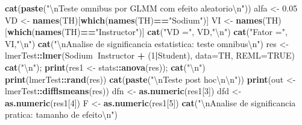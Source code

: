 \documentclass[]{article}
\newenvironment{Shaded}{\begin{snugshade}}{\end{snugshade}}
\newcommand{\KeywordTok}[1]{\textcolor[rgb]{0.13,0.29,0.53}{\textbf{#1}}}
\newcommand{\DataTypeTok}[1]{\textcolor[rgb]{0.13,0.29,0.53}{#1}}
\newcommand{\DecValTok}[1]{\textcolor[rgb]{0.00,0.00,0.81}{#1}}
\newcommand{\FloatTok}[1]{\textcolor[rgb]{0.00,0.00,0.81}{#1}}
\newcommand{\CharTok}[1]{\textcolor[rgb]{0.31,0.60,0.02}{#1}}
\newcommand{\StringTok}[1]{\textcolor[rgb]{0.31,0.60,0.02}{#1}}
\newcommand{\OtherTok}[1]{\textcolor[rgb]{0.56,0.35,0.01}{#1}}
\newcommand{\OperatorTok}[1]{\textcolor[rgb]{0.81,0.36,0.00}{\textbf{#1}}}
\newcommand{\NormalTok}[1]{#1}
\begin{document}
\begin{Shaded}
\begin{Highlighting}[]
\KeywordTok{cat}\NormalTok{(}\KeywordTok{paste}\NormalTok{(}\StringTok{"}\CharTok{\textbackslash{}n}\StringTok{Teste omnibus por GLMM com efeito aleatorio}\CharTok{\textbackslash{}n}\StringTok{"}\NormalTok{))}
\NormalTok{alfa <-}\StringTok{ }\FloatTok{0.05}
\NormalTok{VD <-}\StringTok{ }\KeywordTok{names}\NormalTok{(TH)[}\KeywordTok{which}\NormalTok{(}\KeywordTok{names}\NormalTok{(TH)}\OperatorTok{==}\StringTok{"Sodium"}\NormalTok{)]}
\NormalTok{VI <-}\StringTok{ }\KeywordTok{names}\NormalTok{(TH)[}\KeywordTok{which}\NormalTok{(}\KeywordTok{names}\NormalTok{(TH)}\OperatorTok{==}\StringTok{"Instructor"}\NormalTok{)]}
\KeywordTok{cat}\NormalTok{(}\StringTok{"VD ="}\NormalTok{, VD,}\StringTok{"}\CharTok{\textbackslash{}n}\StringTok{"}\NormalTok{)}
\KeywordTok{cat}\NormalTok{(}\StringTok{"Fator ="}\NormalTok{, VI,}\StringTok{"}\CharTok{\textbackslash{}n}\StringTok{"}\NormalTok{)}
\KeywordTok{cat}\NormalTok{(}\StringTok{"}\CharTok{\textbackslash{}n}\StringTok{Analise de significancia estatistica: teste omnibus}\CharTok{\textbackslash{}n}\StringTok{"}\NormalTok{)}
\NormalTok{res <-}\StringTok{ }\NormalTok{lmerTest}\OperatorTok{::}\KeywordTok{lmer}\NormalTok{(Sodium}\OperatorTok{~}\NormalTok{Instructor }\OperatorTok{+}\StringTok{ }\NormalTok{(}\DecValTok{1}\OperatorTok{|}\NormalTok{Student), }\DataTypeTok{data=}\NormalTok{TH, }\DataTypeTok{REML=}\OtherTok{TRUE}\NormalTok{)}
\KeywordTok{cat}\NormalTok{(}\StringTok{"}\CharTok{\textbackslash{}n}\StringTok{"}\NormalTok{); }\KeywordTok{print}\NormalTok{(res1 <-}\StringTok{ }\NormalTok{stats}\OperatorTok{::}\KeywordTok{anova}\NormalTok{(res)); }\KeywordTok{cat}\NormalTok{(}\StringTok{"}\CharTok{\textbackslash{}n}\StringTok{"}\NormalTok{)}
\KeywordTok{print}\NormalTok{(lmerTest}\OperatorTok{::}\KeywordTok{rand}\NormalTok{(res))}
\KeywordTok{cat}\NormalTok{(}\KeywordTok{paste}\NormalTok{(}\StringTok{"}\CharTok{\textbackslash{}n}\StringTok{Teste post hoc}\CharTok{\textbackslash{}n\textbackslash{}n}\StringTok{"}\NormalTok{))}
\KeywordTok{print}\NormalTok{(out <-}\StringTok{ }\NormalTok{lmerTest}\OperatorTok{::}\KeywordTok{difflsmeans}\NormalTok{(res))}
\NormalTok{dfn <-}\StringTok{ }\KeywordTok{as.numeric}\NormalTok{(res1[}\DecValTok{3}\NormalTok{])}
\NormalTok{dfd <-}\StringTok{ }\KeywordTok{as.numeric}\NormalTok{(res1[}\DecValTok{4}\NormalTok{])}
\NormalTok{F <-}\StringTok{ }\KeywordTok{as.numeric}\NormalTok{(res1[}\DecValTok{5}\NormalTok{])}
\KeywordTok{cat}\NormalTok{(}\StringTok{"}\CharTok{\textbackslash{}n}\StringTok{Analise de significancia pratica: tamanho de efeito}\CharTok{\textbackslash{}n}\StringTok{"}\NormalTok{)}

\end{Highlighting}
\end{Shaded}
\end{document}
